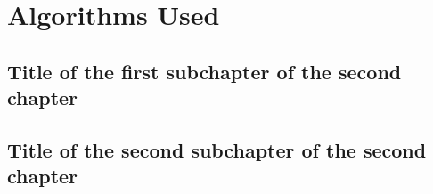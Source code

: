 \chapter{Algorithms Used}

\section{Title of the first subchapter of the second chapter}

\section{Title of the second subchapter of the second chapter}
